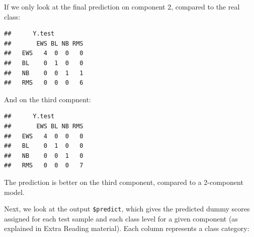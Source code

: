 \documentclass[]{book}
\newenvironment{Shaded}{\begin{snugshade}}{\end{snugshade}}
\newcommand{\CommentTok}[1]{\textcolor[rgb]{0.56,0.35,0.01}{\textit{#1}}}
\newcommand{\DataTypeTok}[1]{\textcolor[rgb]{0.13,0.29,0.53}{#1}}
\newcommand{\DecValTok}[1]{\textcolor[rgb]{0.00,0.00,0.81}{#1}}
\newcommand{\KeywordTok}[1]{\textcolor[rgb]{0.13,0.29,0.53}{\textbf{#1}}}
\newcommand{\NormalTok}[1]{#1}
\newcommand{\OperatorTok}[1]{\textcolor[rgb]{0.81,0.36,0.00}{\textbf{#1}}}
\newcommand{\StringTok}[1]{\textcolor[rgb]{0.31,0.60,0.02}{#1}}
\begin{document}
If we only look at the final prediction on component 2, compared to the real class:

\begin{Shaded}
\end{Shaded}

\begin{verbatim}
##      Y.test
##       EWS BL NB RMS
##   EWS   4  0  0   0
##   BL    0  1  0   0
##   NB    0  0  1   1
##   RMS   0  0  0   6
\end{verbatim}

And on the third compnent:

\begin{Shaded}
\end{Shaded}

\begin{verbatim}
##      Y.test
##       EWS BL NB RMS
##   EWS   4  0  0   0
##   BL    0  1  0   0
##   NB    0  0  1   0
##   RMS   0  0  0   7
\end{verbatim}

The prediction is better on the third component, compared to a 2-component model.

Next, we look at the output \texttt{\$predict}, which gives the predicted dummy scores assigned for each test sample and each class level for a given component (as explained in Extra Reading material). Each column represents a class category:

\begin{Shaded}
\end{Shaded}
\end{document}
